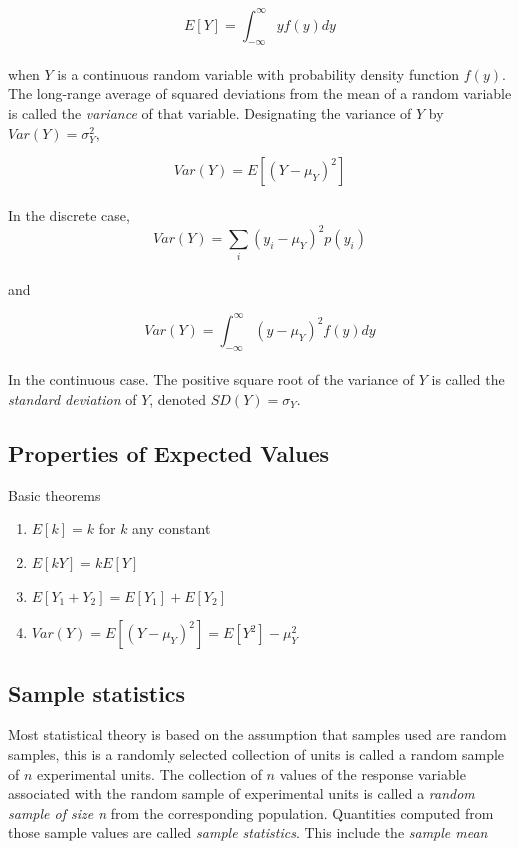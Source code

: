 \documentclass{WileySev}
\begin{document}
\begin{equation}
E[Y]=\int_{-\infty}^{\infty}yf(y)dy
\end{equation}
\\
when $Y$ is a continuous random variable with probability density function $f(y)$.
The long-range average of squared deviations from the mean of a random variable is called the \textit{variance} of that variable. Designating the variance of $Y$ by $Var(Y)=\sigma_{Y}^2$,

\begin{equation}
Var(Y)=E[(Y-\mu_Y)^2]
\end{equation}
\\
In the discrete case,
\begin{equation}
Var(Y)=\sum_i(y_i-\mu_Y)^2p(y_i)
\end{equation}
\\
and

\begin{equation}
Var(Y)=\int_{-\infty}^{\infty}(y-\mu_Y)^2f(y)dy
\end{equation}
\\
In the continuous case. The positive square root of the variance of $Y$ is called the \textit{standard deviation} of $Y$, denoted $SD(Y)=\sigma_{Y}$.

\subsection{Properties of Expected Values}

Basic theorems
\begin{enumerate}
 \item $E[k]=k$ for $k$ any constant
 \item $E[kY]=kE[Y]$
 \item $E[Y_1+Y_2]=E[Y_1]+E[Y_2]$
 \item $Var(Y)=E[(Y-\mu_Y)^2]=E[Y^2]-\mu_Y^2$
\end{enumerate}

\subsection{Sample statistics}

Most statistical theory is based on the assumption that samples used are random samples, this is a randomly selected collection of units is called a random sample of $n$ experimental units. The collection of $n$ values of the response variable associated with the random sample of experimental units is called a \textit{random sample of size n} from the corresponding population. Quantities computed from those sample values are called \textit{sample statistics}. This include the \textit{sample mean}
\end{document}

